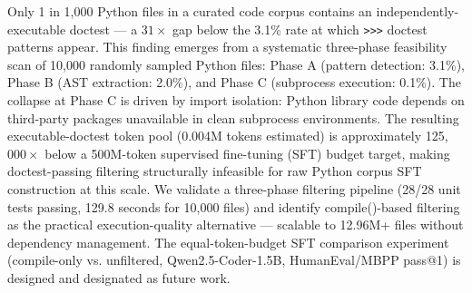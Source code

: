 
Only 1 in 1,000 Python files in a curated code corpus contains an independently-executable
doctest --- a $31\times$ gap below the 3.1\% rate at which \texttt{>>>} doctest patterns appear. This finding
emerges from a systematic three-phase feasibility scan of 10,000 randomly sampled Python files:
Phase A (pattern detection: 3.1\%), Phase B (AST extraction: 2.0\%), and Phase C (subprocess
execution: 0.1\%). The collapse at Phase C is driven by import isolation: Python library code
depends on third-party packages unavailable in clean subprocess environments. The resulting
executable-doctest token pool (0.004M tokens estimated) is approximately 125,$000\times$ below a
500M-token supervised fine-tuning (SFT) budget target, making doctest-passing filtering
structurally infeasible for raw Python corpus SFT construction at this scale. We validate
a three-phase filtering pipeline (28/28 unit tests passing, 129.8 seconds for 10,000 files)
and identify compile()-based filtering as the practical execution-quality alternative ---
scalable to 12.96M+ files without dependency management. The equal-token-budget SFT
comparison experiment (compile-only vs. unfiltered, Qwen2.5-Coder-1.5B, HumanEval/MBPP
pass@1) is designed and designated as future work.

